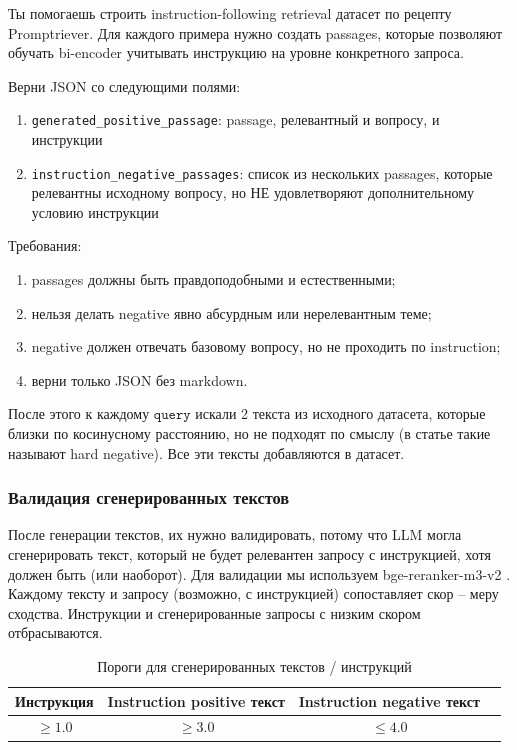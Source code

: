 \documentclass[12pt, a4paper, oneside]{article}
\begin{document}
\begin{promptpassage}
\small
Ты помогаешь строить instruction-following retrieval датасет по рецепту Promptriever.
Для каждого примера нужно создать passages, которые позволяют обучать bi-encoder
учитывать инструкцию на уровне конкретного запроса.

Верни JSON со следующими полями:
\begin{enumerate}
    \item \texttt{generated\_positive\_passage}: passage, релевантный и вопросу, и инструкции
    \item \texttt{instruction\_negative\_passages}: список из нескольких passages, которые релевантны исходному вопросу, 
    но НЕ удовлетворяют дополнительному условию инструкции
\end{enumerate}
Требования:
\begin{enumerate}
    \item passages должны быть правдоподобными и естественными;
    \item нельзя делать negative явно абсурдным или нерелевантным теме;
    \item negative должен отвечать базовому вопросу, но не проходить по instruction;
    \item верни только JSON без markdown.
\end{enumerate}
\end{promptpassage}

После этого к каждому $\texttt{query}$ искали 2 текста
из исходного датасета, которые близки по косинусному расстоянию, но не подходят 
по смыслу (в статье такие называют hard negative). 
Все эти тексты добавляются в датасет. 

\subsubsection*{Валидация сгенерированных текстов}
После генерации текстов, их нужно валидировать, потому что 
LLM могла сгенерировать текст, который не будет 
релевантен запросу с инструкцией, хотя должен быть (или наоборот). 
Для валидации мы используем bge-reranker-m3-v2 \cite{chen2025m3embeddingmultilingualitymultifunctionalitymultigranularity}.
Каждому тексту и запросу (возможно, с инструкцией) 
сопоставляет скор -- меру сходства. Инструкции и сгенерированные запросы 
с низким скором отбрасываются. 

\begin{table}[H]
    \centering
    \caption{Пороги для сгенерированных текстов / инструкций}
    \label{tab:generation_thresholds}
    \begin{tabular}{cccc}
        \toprule
        \textbf{Инструкция} & \textbf{Instruction positive текст} & \textbf{Instruction negative текст} \\
        \midrule
        $\ge 1.0$ & $\ge 3.0$ & $\le 4.0$ \\
        \bottomrule
    \end{tabular}
    \vspace{0.2cm}
\end{table}
\end{document}
